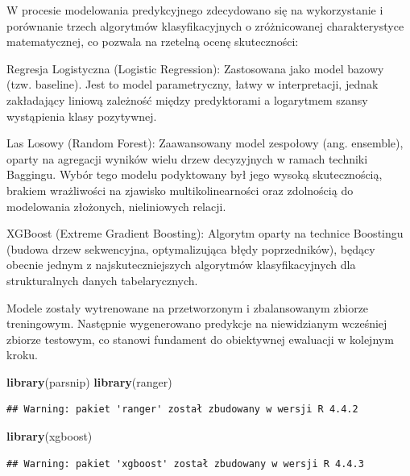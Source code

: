 \documentclass[
]{article}
\newenvironment{Shaded}{\begin{snugshade}}{\end{snugshade}}
\newcommand{\FunctionTok}[1]{\textcolor[rgb]{0.13,0.29,0.53}{\textbf{#1}}}
\newcommand{\NormalTok}[1]{#1}
\begin{document}
W procesie modelowania predykcyjnego zdecydowano się na wykorzystanie i
porównanie trzech algorytmów klasyfikacyjnych o zróżnicowanej
charakterystyce matematycznej, co pozwala na rzetelną ocenę
skuteczności:

Regresja Logistyczna (Logistic Regression): Zastosowana jako model
bazowy (tzw. baseline). Jest to model parametryczny, łatwy w
interpretacji, jednak zakładający liniową zależność między predyktorami
a logarytmem szansy wystąpienia klasy pozytywnej.

Las Losowy (Random Forest): Zaawansowany model zespołowy (ang.
ensemble), oparty na agregacji wyników wielu drzew decyzyjnych w ramach
techniki Baggingu. Wybór tego modelu podyktowany był jego wysoką
skutecznością, brakiem wrażliwości na zjawisko multikolinearności oraz
zdolnością do modelowania złożonych, nieliniowych relacji.

XGBoost (Extreme Gradient Boosting): Algorytm oparty na technice
Boostingu (budowa drzew sekwencyjna, optymalizująca błędy poprzedników),
będący obecnie jednym z najskuteczniejszych algorytmów klasyfikacyjnych
dla strukturalnych danych tabelarycznych.

Modele zostały wytrenowane na przetworzonym i zbalansowanym zbiorze
treningowym. Następnie wygenerowano predykcje na niewidzianym wcześniej
zbiorze testowym, co stanowi fundament do obiektywnej ewaluacji w
kolejnym kroku.

\begin{Shaded}
\begin{Highlighting}[]
\FunctionTok{library}\NormalTok{(parsnip)}
\FunctionTok{library}\NormalTok{(ranger)}
\end{Highlighting}
\end{Shaded}

\begin{verbatim}
## Warning: pakiet 'ranger' został zbudowany w wersji R 4.4.2
\end{verbatim}

\begin{Shaded}
\begin{Highlighting}[]
\FunctionTok{library}\NormalTok{(xgboost)}
\end{Highlighting}
\end{Shaded}

\begin{verbatim}
## Warning: pakiet 'xgboost' został zbudowany w wersji R 4.4.3
\end{verbatim}
\end{document}
